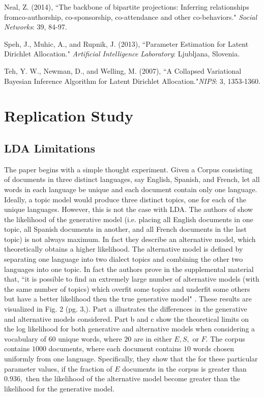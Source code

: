 \documentclass[12pt]{article}
\begin{document}
\begin{thebibliography}{4}
	Neal, Z. (2014),
	``The backbone of bipartite projections: Inferring relationships fromco-authorship, co-sponsorship, co-attendance and other co-behaviors."
	\textit{Social Networks}: 39, 84-97.
	
	Speh, J., Muhic, A., and Rupnik, J.  (2013),
	``Parameter Estimation for Latent Dirichlet Allocation." \textit{Artificial Intelligence Laboratory}: Ljubljana, Slovenia.
		
	Teh, Y. W., Newman, D., and Welling, M.  (2007),
	``A Collapsed Variational Bayesian Inference Algorithm for Latent Dirichlet 
	Allocation."\textit{NIPS}: 3, 1353-1360.
	
\end{thebibliography}

\newpage
\appendix
\hypertarget{A}{}
\section{Replication Study}
\subsection{LDA Limitations}
The paper \cite{main} begins with a simple thought experiment. Given a Corpus consisting of documents in three distinct languages, say English, Spanish, and French, let all words in each language be unique and each document contain only one language. Ideally, a topic model would produce three distinct topics, one for each of the unique languages. However, this is not the case with LDA. The authors of \cite{main} show the likelihood of the generative model (i.e. placing all English documents in one topic, all Spanish documents in another, and all French documents in the last topic) is not always maximum. In fact they describe an alternative model, which theoretically obtains a higher likelihood. The alternative model is defined by separating one language into two dialect topics and combining the other two languages into one topic. In fact the authors prove in the supplemental material that, ``it is possible to find an extremely large number of alternative models (with the same number of topics) which overfit some topics and underfit some others but have a better likelihood then the true generative model" \cite{mainExtra}. These results are visualized in Fig. 2 (pg. 3,\cite{main}). Part a illustrates the differences in the generative and alternative models considered. Part b and c show the theoretical limits on the log likelihood for both generative and alternative models when considering a vocabulary of $60$ unique words, where $20$ are in either $E, S,$ or $F$. The corpus contains $1000$ documents, where each document contains $10$ words chosen uniformly from one language. Specifically, they show that the for these particular parameter values, if the fraction of $E$ documents in the corpus is greater than $0.936,$ then the likelihood of the alternative model become greater than the likelihood for the generative model. 
\\
\end{document}
